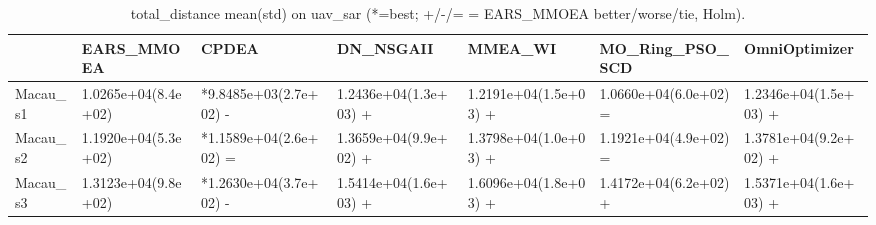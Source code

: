 \begin{table}[t]
\centering
\caption{total_distance mean(std) on uav_sar (*=best; +/-/= = EARS_MMOEA better/worse/tie, Holm).}
\label{tab:uav_sar_total_distance}
\begin{tabular}{lllllll}
\toprule
 & EARS\_MMOEA & CPDEA & DN\_NSGAII & MMEA\_WI & MO\_Ring\_PSO\_SCD & OmniOptimizer \\
\midrule
Macau\_s1 & 1.0265e+04(8.4e+02) & *9.8485e+03(2.7e+02) - & 1.2436e+04(1.3e+03) + & 1.2191e+04(1.5e+03) + & 1.0660e+04(6.0e+02) = & 1.2346e+04(1.5e+03) + \\
Macau\_s2 & 1.1920e+04(5.3e+02) & *1.1589e+04(2.6e+02) = & 1.3659e+04(9.9e+02) + & 1.3798e+04(1.0e+03) + & 1.1921e+04(4.9e+02) = & 1.3781e+04(9.2e+02) + \\
Macau\_s3 & 1.3123e+04(9.8e+02) & *1.2630e+04(3.7e+02) - & 1.5414e+04(1.6e+03) + & 1.6096e+04(1.8e+03) + & 1.4172e+04(6.2e+02) + & 1.5371e+04(1.6e+03) + \\
\bottomrule
\end{tabular}
\end{table}
